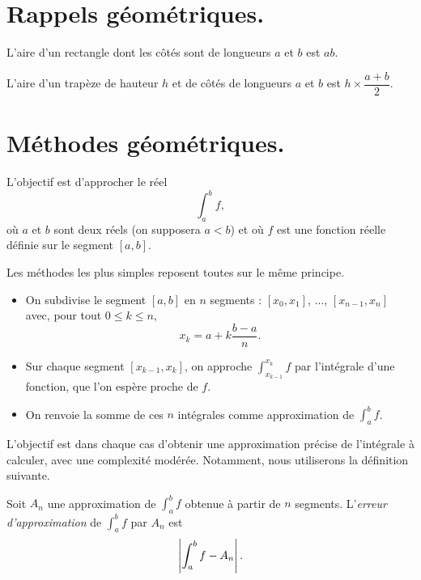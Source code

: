 \section{Rappels géométriques.}

\begin{prop} 
  L'aire d'un rectangle dont les côtés sont de longueurs $a$ et $b$ est $ab$. 
\end{prop}

\begin{prop}
  L'aire d'un trapèze de hauteur $h$ et de côtés de longueurs $a$ et $b$ est $h\times \dfrac{a+b}{2}$.
\end{prop}



\section{Méthodes géométriques.}

L'objectif est d'approcher le réel 
\begin{equation*}
  \int_a^b f,
\end{equation*}
où $a$ et $b$ sont deux réels (on supposera $a<b$) et où $f$ est une fonction réelle définie sur le segment $[a,b]$.

Les méthodes les plus simples reposent toutes sur le même principe. 
\begin{itemize}
  \item On subdivise le segment $[a,b]$ en $n$ segments : $[x_0,x_1]$, ..., $[x_{n-1},x_n]$ avec, pour tout $0 \leq k \leq n$, 
    \begin{equation*}
      x_k = a + k\dfrac{b-a}{n}. 
    \end{equation*}
  \item Sur chaque segment $[x_{k-1},x_{k}]$, on approche $\displaystyle\int_{x_{k-1}}^{x_{k}} f$ par l'intégrale d'une fonction, que l'on espère proche de $f$. 
  \item On renvoie la somme de ces $n$ intégrales comme approximation de $\displaystyle\int_a^b f$.
\end{itemize}

L'objectif est dans chaque cas d'obtenir une approximation précise de l'intégrale à calculer, avec une complexité modérée. Notamment, nous utiliserons la définition suivante. 

\begin{defi}
  Soit $A_n$ une approximation de $\displaystyle\int_a^b f$ obtenue à partir de $n$ segments. L'\emph{erreur d'approximation} de $\displaystyle\int_a^b f$ par $A_n$ est 
  \begin{equation*}
    \left|\displaystyle\int_a^b f - A_n\right|.
  \end{equation*}
\end{defi}


